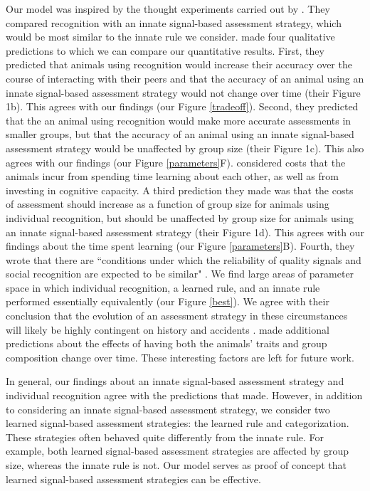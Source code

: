 Our model was inspired by the thought experiments carried out by \citet{sheehan2016evotradeoff}. They compared recognition with an innate signal-based assessment strategy, which would be most similar to the innate rule we consider. \citet{sheehan2016evotradeoff} made four qualitative predictions to which we can compare our quantitative results. First, they predicted that animals using recognition would increase their accuracy over the course of interacting with their peers and that the accuracy of an animal using an innate signal-based assessment strategy would not change over time (their Figure 1b). This agrees with our findings (our Figure \ref{tradeoff}).  Second, they predicted that the an animal using recognition would make more accurate assessments in smaller groups, but that the accuracy of an animal using an innate signal-based assessment strategy would be unaffected by group size (their Figure 1c). This also agrees with our findings (our Figure \ref{parameters}F). \citet{sheehan2016evotradeoff} considered costs that the animals incur from spending time learning about each other, as well as from investing in cognitive capacity. A third prediction they made was that the costs of assessment should increase as a function of group size for animals using individual recognition, but should be unaffected by group size for animals using an innate signal-based assessment strategy (their Figure 1d). This agrees with our findings about the time spent learning (our Figure \ref{parameters}B). Fourth, they wrote that there are ``conditions under which the reliability of quality signals and social recognition are expected to be similar" \citep{sheehan2016evotradeoff}. We find large areas of parameter space in which individual recognition, a learned rule, and an innate rule performed essentially equivalently (our Figure \ref{best}). We agree with their conclusion that the evolution of an assessment strategy in these circumstances will likely be highly contingent on history and accidents \citep{sheehan2016evotradeoff}. \citet{sheehan2016evotradeoff} made additional predictions about the effects of having both the animals' traits and group composition change over time. These interesting factors are left for future work.

In general, our findings about an innate signal-based assessment strategy and individual recognition agree with the predictions that \citet{sheehan2016evotradeoff} made. However, in addition to considering an innate signal-based assessment strategy, we consider two learned signal-based assessment strategies: the learned rule and categorization. These strategies often behaved quite differently from the innate rule. For example, both learned signal-based assessment strategies are affected by group size, whereas the innate rule is not. Our model serves as proof of concept that learned signal-based assessment strategies can be effective.

